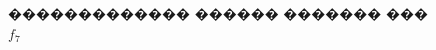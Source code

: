 \documentclass[a4paper]{article}
\begin{document}
\begin{figure}[h]
\begin{minipage}[h]{0.49\linewidth}
  \end{minipage}
  \caption{������������� ������ ������� ��� $f_7$}
  \label{ris:image1}
\end{figure}
\end{document}
